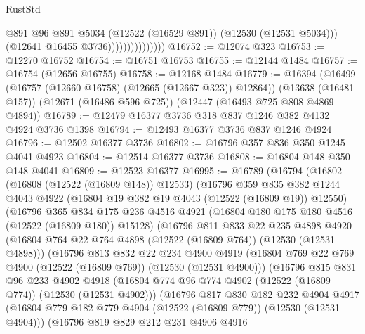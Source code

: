 \begin{lexlean}{RustStd}
\begin{coremodule}
                                  @891
                                  @96
                                  @891
                                  @5034
                                  (@12522 (@16529 @891))
                                  (@12530 (@12531 @5034)))
                                (@12641 @16455 @3736)))))))))))))))
@16752 := @12074 @323
@16753 := @12270 @16752
@16754 := @16751 @16753
@16755 := @12144 @1484
@16757 := @16754 (@12656 @16755)
@16758 := @12168 @1484
@16779 := @16394
    (@16499 (@16757 (@12660 @16758) (@12665 (@12667 @323)) @12864))
    (@13638 (@16481 @157))
    (@12671 (@16486 @596 @725))
    (@12447 (@16493 @725 @808 @4869 @4894))
@16789 := @12479 @16377 @3736 @318 @837 @1246 @382 @4132 @4924 @3736 @1398
@16794 := @12493 @16377 @3736 @837 @1246 @4924
@16796 := @12502 @16377 @3736
@16802 := @16796 @357 @836 @350 @1245 @4041 @4923
@16804 := @12514 @16377 @3736
@16808 := @16804 @148 @350 @148 @4041
@16809 := @12523 @16377
@16995 := @16789
    (@16794
      (@16802
        (@16808 (@12522 (@16809 @148)) @12533)
        (@16796
          @359
          @835
          @382
          @1244
          @4043
          @4922
          (@16804 @19 @382 @19 @4043 (@12522 (@16809 @19)) @12550)
          (@16796
            @365
            @834
            @175
            @236
            @4516
            @4921
            (@16804 @180 @175 @180 @4516 (@12522 (@16809 @180)) @15128)
            (@16796
              @811
              @833
              @22
              @235
              @4898
              @4920
              (@16804 @764 @22 @764 @4898 (@12522 (@16809 @764)) (@12530 (@12531 @4898)))
              (@16796
                @813
                @832
                @22
                @234
                @4900
                @4919
                (@16804 @769 @22 @769 @4900 (@12522 (@16809 @769)) (@12530 (@12531 @4900)))
                (@16796
                  @815
                  @831
                  @96
                  @233
                  @4902
                  @4918
                  (@16804 @774 @96 @774 @4902 (@12522 (@16809 @774)) (@12530 (@12531 @4902)))
                  (@16796
                    @817
                    @830
                    @182
                    @232
                    @4904
                    @4917
                    (@16804 @779 @182 @779 @4904 (@12522 (@16809 @779)) (@12530 (@12531 @4904)))
                    (@16796
                      @819
                      @829
                      @212
                      @231
                      @4906
                      @4916

\end{coremodule}
\end{lexlean}
